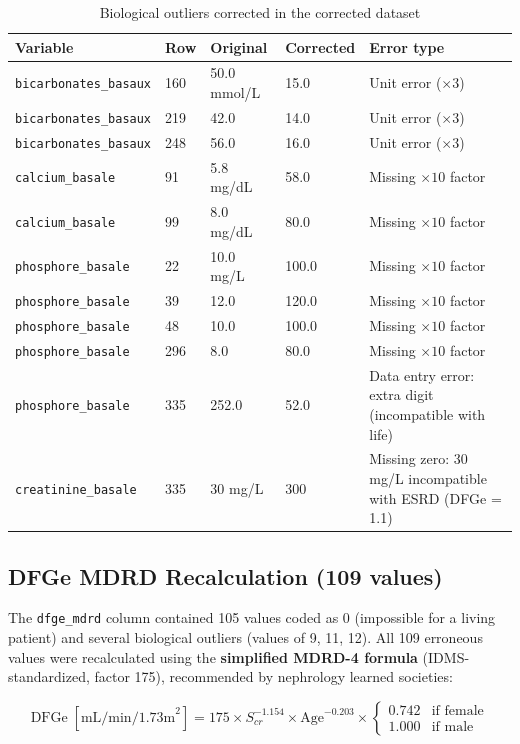 \documentclass[12pt,a4paper,twoside]{report}
\begin{document}
\begin{table}[htbp]
\centering
\caption{Biological outliers corrected in the corrected dataset}
\label{tab:bio_outliers}
\small\begin{tabularx}{\textwidth}{p{3.5cm}p{1.5cm}p{2cm}p{1.8cm}X}
\toprule
\textbf{Variable} & \textbf{Row} & \textbf{Original} & \textbf{Corrected} & \textbf{Error type} \\
\midrule
\texttt{bicarbonates\_basaux} & 160 & 50.0 mmol/L & 15.0 & Unit error ($\times3$) \\
\texttt{bicarbonates\_basaux} & 219 & 42.0 & 14.0 & Unit error ($\times3$) \\
\texttt{bicarbonates\_basaux} & 248 & 56.0 & 16.0 & Unit error ($\times3$) \\
\texttt{calcium\_basale} & 91 & 5.8 mg/dL & 58.0 & Missing $\times10$ factor \\
\texttt{calcium\_basale} & 99 & 8.0 mg/dL & 80.0 & Missing $\times10$ factor \\
\texttt{phosphore\_basale} & 22 & 10.0 mg/L & 100.0 & Missing $\times10$ factor \\
\texttt{phosphore\_basale} & 39 & 12.0 & 120.0 & Missing $\times10$ factor \\
\texttt{phosphore\_basale} & 48 & 10.0 & 100.0 & Missing $\times10$ factor \\
\texttt{phosphore\_basale} & 296 & 8.0 & 80.0 & Missing $\times10$ factor \\
\texttt{phosphore\_basale} & 335 & 252.0 & 52.0 & Data entry error: extra digit (incompatible with life) \\
\texttt{creatinine\_basale} & 335 & 30 mg/L & 300 & Missing zero: 30 mg/L incompatible with ESRD (DFGe = 1.1) \\
\bottomrule
\end{tabularx}
\end{table}

\subsection{DFGe MDRD Recalculation (109 values)}

The \texttt{dfge\_mdrd} column contained 105 values coded as 0 (impossible for a living patient) and several biological outliers (values of 9, 11, 12). All 109 erroneous values were recalculated using the \textbf{simplified MDRD-4 formula} (IDMS-standardized, factor 175), recommended by nephrology learned societies:

\begin{equation}
\text{DFGe} \; [\text{mL/min/1.73m}^2] = 175 \times S_{cr}^{-1.154} \times \text{Age}^{-0.203} \times
\begin{cases}
0.742 & \text{if female} \\
1.000 & \text{if male}
\end{cases}
\label{eq:mdrd}
\end{equation}
\end{document}
